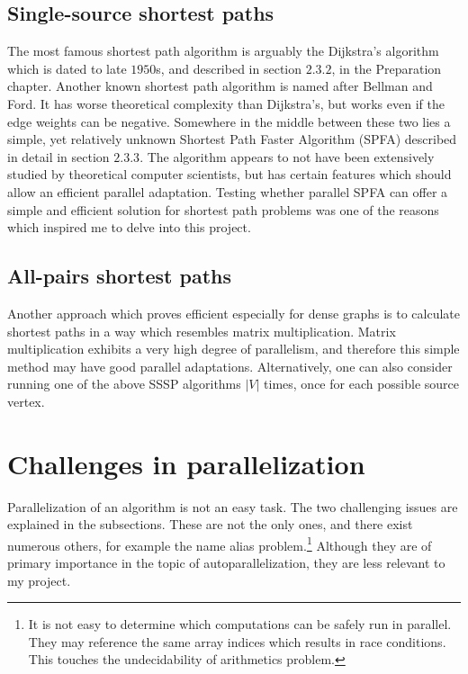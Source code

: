 \documentclass[12pt,a4paper,oneside,openright]{report}
\begin{document}
\subsection{Single-source shortest paths}
The most famous shortest path algorithm is arguably the Dijkstra's algorithm which is dated to late $1950$s, and described in section $2.3.2$, in the Preparation chapter. Another known shortest path algorithm is named after Bellman and Ford. It has worse theoretical complexity than Dijkstra's, but works even if the edge weights can be negative. Somewhere in the middle between these two lies a simple, yet relatively unknown Shortest Path Faster Algorithm (SPFA) described in detail in section $2.3.3$. The algorithm appears to not have been extensively studied by theoretical computer scientists, but has certain features which should allow an efficient parallel adaptation. Testing whether parallel SPFA can offer a simple and efficient solution for shortest path problems was one of the reasons which inspired me to delve into this project.

\subsection{All-pairs shortest paths}
Another approach which proves efficient especially for dense graphs is to calculate shortest paths in a way which resembles matrix multiplication. Matrix multiplication exhibits a very high degree of parallelism, and therefore this simple method may have good parallel adaptations. Alternatively, one can also consider running one of the above SSSP algorithms $|V|$ times, once for each possible source vertex.

\section{Challenges in parallelization}
Parallelization of an algorithm is not an easy task. The two challenging issues are explained in the subsections. These are not the only ones, and there exist numerous others, for example the name alias problem.\footnote{It is not easy to determine which computations can be safely run in parallel. They may reference the same array indices which results in race conditions. This touches the  undecidability of arithmetics problem.} Although they are of primary importance in the topic of autoparallelization, they are less relevant to my project.
\end{document}

